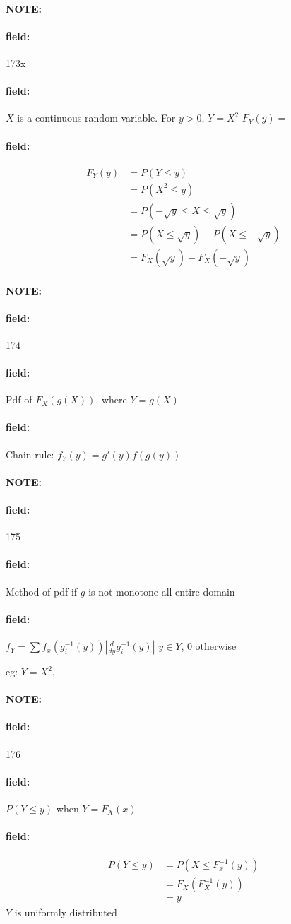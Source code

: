 \documentclass[12pt]{article}
\newenvironment{note}{\paragraph{NOTE:}}{}
\newenvironment{field}{\paragraph{field:}}{}
\begin{document}
\begin{note} \begin{field} \tiny 173x  \end{field}
  \begin{field}
    $X$ is a continuous random variable. For $y > 0$, $Y = X^2$
    $F_Y(y) = $
  \end{field}
  \begin{field}
    \begin{align*}
      F_Y(y) &= P(Y \leq y)\\
      &= P(X^2 \leq y)\\
      &= P(- \sqrt{y} \leq X \leq \sqrt{y})\\
      &= P(X \leq \sqrt{y}) - P(X \leq -\sqrt{y})\\
      &= F_X(\sqrt{y}) - F_X( - \sqrt{y})
    \end{align*}
  \end{field}
\end{note}

\begin{note} \begin{field} \tiny 174 \end{field}
  \begin{field}
    Pdf of $F_X(g(X))$, where $Y = g(X)$
  \end{field}
  \begin{field}
    Chain rule:
    $f_Y(y) = g'(y)f(g(y))$
  \end{field}
\end{note}

\begin{note} \begin{field} \tiny 175 \end{field}
  \begin{field}
    Method of pdf if $g$ is not monotone all entire domain
  \end{field}
  \begin{field}
    $f_Y = \sum f_x(g_i^{-1}(y))|\frac{d}{dy}g_i^{-1}(y)|$ $y \in Y$, 0 otherwise

    eg: $Y = X^2$,
  \end{field}
\end{note}

\begin{note} \begin{field} \tiny 176 \end{field}
  \begin{field}
    $P(Y  \leq y)$ when $Y = F_X(x)$
  \end{field}
  \begin{field}
    \begin{align*}
      P(Y \leq y) &= P(X \leq F_x^{-1}(y))\\
      &= F_X(F_X^{-1}(y))\\
      &= y
    \end{align*}
    $Y$ is uniformly distributed
  \end{field}
\end{note}
\end{document}
